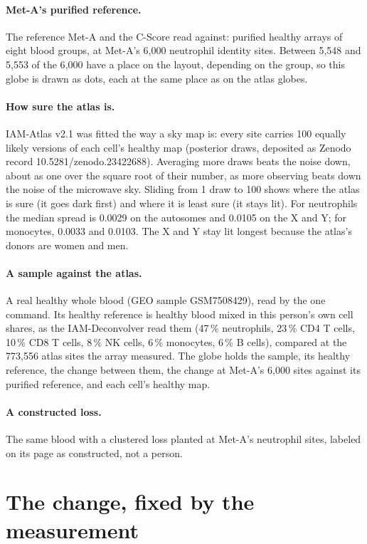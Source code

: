 \paragraph{Met-A's purified reference.} The reference Met-A and the C-Score read against: purified healthy arrays of eight blood
groups, at Met-A's 6{,}000 neutrophil identity sites. Between 5{,}548 and 5{,}553 of the 6{,}000 have a place on the layout, depending
on the group, so this globe is drawn as dots, each at the same place as on the atlas globes.

\paragraph{How sure the atlas is.} IAM-Atlas v2.1 was fitted the way a sky map is: every site carries 100 equally likely versions of
each cell's healthy map (posterior draws, deposited as Zenodo record 10.5281/zenodo.23422688). Averaging more draws beats the noise
down, about as one over the square root of their number, as more observing beats down the noise of the microwave sky. Sliding from 1
draw to 100 shows where the atlas is sure (it goes dark first) and where it is least sure (it stays lit). For neutrophils the median
spread is 0.0029 on the autosomes and 0.0105 on the X and Y; for monocytes, 0.0033 and 0.0103. The X and Y stay lit longest because
the atlas's donors are women and men.

\paragraph{A sample against the atlas.} A real healthy whole blood (GEO sample GSM7508429), read by the one command. Its healthy
reference is healthy blood mixed in this person's own cell shares, as the IAM-Deconvolver read them (47\,\% neutrophils, 23\,\% CD4 T
cells, 10\,\% CD8 T cells, 8\,\% NK cells, 6\,\% monocytes, 6\,\% B cells), compared at the 773{,}556 atlas sites the array measured.
The globe holds the sample, its healthy reference, the change between them, the change at Met-A's 6{,}000 sites against its purified
reference, and each cell's healthy map.

\paragraph{A constructed loss.} The same blood with a clustered loss planted at Met-A's neutrophil sites, labeled on its page as
constructed, not a person.

\section{The change, fixed by the measurement}

